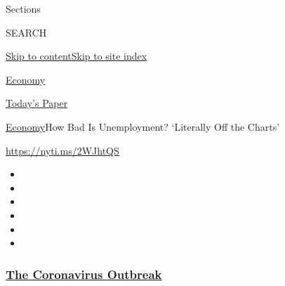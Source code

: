 Sections

SEARCH

\protect\hyperlink{site-content}{Skip to
content}\protect\hyperlink{site-index}{Skip to site index}

\href{https://www.nytimes3xbfgragh.onion/section/business/economy}{Economy}

\href{https://myaccount.nytimes3xbfgragh.onion/auth/login?response_type=cookie\&client_id=vi}{}

\href{https://www.nytimes3xbfgragh.onion/section/todayspaper}{Today's
Paper}

\href{/section/business/economy}{Economy}\textbar{}How Bad Is
Unemployment? `Literally Off the Charts'

\url{https://nyti.ms/2WJhtQS}

\begin{itemize}
\item
\item
\item
\item
\item
\item
\end{itemize}

\hypertarget{the-coronavirus-outbreak}{%
\subsubsection{\texorpdfstring{\href{https://www.nytimes3xbfgragh.onion/news-event/coronavirus?name=styln-coronavirus-national\&region=TOP_BANNER\&variant=undefined\&block=storyline_menu_recirc\&action=click\&pgtype=Interactive\&impression_id=683aef60-e3b5-11ea-bab9-57fae4024651}{The
Coronavirus
Outbreak}}{The Coronavirus Outbreak}}\label{the-coronavirus-outbreak}}

